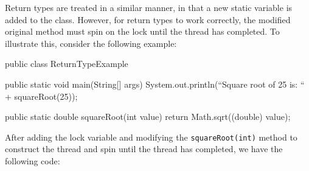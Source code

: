 \noindent
Return types are treated in a similar manner, in that a new static variable
is added to the class.  However, for return types to work correctly, the
modified original method must spin on the lock until the thread has completed.
To illustrate this, consider the following example:

\begin{listing}{1}
public class ReturnTypeExample {

   public static void main(String[] args) {
      System.out.println(``Square root of 25 is: `` + squareRoot(25));
   }

   public static double squareRoot(int value) {
      return Math.sqrt((double) value);
   }
}
\end{listing}

\noindent
After adding the lock variable and modifying the \texttt{squareRoot(int)}
method to construct the thread and spin until the thread has completed, we
have the following code:

